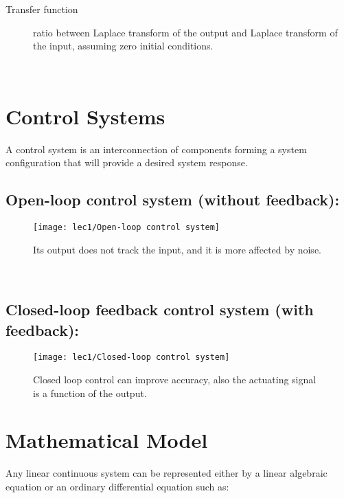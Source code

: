 \begin{description}
	\item[Transfer function] ratio between Laplace transform of the output and Laplace transform of the input, assuming zero initial conditions.
\end{description}
 \leavevmode\\[-5em]



\section{Control Systems}
A control system is an interconnection of components forming a system configuration that will provide a desired system response.
\\[-2em]

\subsection[Open-loop control system]{Open-loop control system (without feedback):}
\begin{figure}[hb]
		\raggedleft
		\texttt{[image: lec1/Open-loop control system]}
		\caption{Its output does not track the input, and it is more affected by noise.}
\end{figure}
 \leavevmode\\[-4em]

\subsection[Closed-loop control system]{Closed-loop feedback control system (with feedback):}

\begin{figure}[hb]
		\raggedleft
		\texttt{[image: lec1/Closed-loop control system]}
		\caption{Closed loop control can improve accuracy, also the actuating signal is a function of the output.}
\end{figure}



\section{Mathematical Model}
Any linear continuous system can be represented either by a linear algebraic equation or an ordinary differential equation such as:\\[-4mm]

